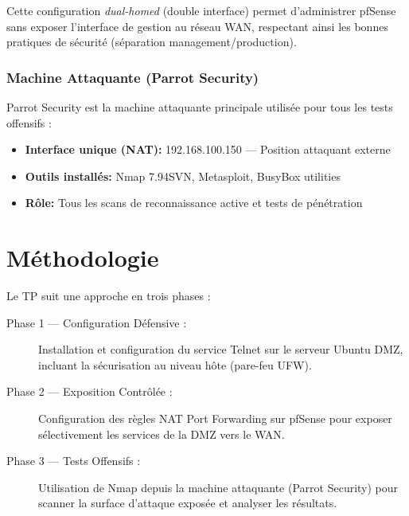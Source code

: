 \documentclass[12pt,a4paper,openany]{report}
\begin{document}
	Cette configuration \textit{dual-homed} (double interface) permet d'administrer 
	pfSense sans exposer l'interface de gestion au réseau WAN, respectant ainsi les 
	bonnes pratiques de sécurité (séparation management/production).
	
	\subsubsection{Machine Attaquante (Parrot Security)}
	Parrot Security est la machine attaquante principale utilisée pour tous les 
	tests offensifs :
	\begin{itemize}
		\item \textbf{Interface unique (NAT):} 192.168.100.150 --- Position attaquant externe
		\item \textbf{Outils installés:} Nmap 7.94SVN, Metasploit, BusyBox utilities
		\item \textbf{Rôle:} Tous les scans de reconnaissance active et tests de pénétration
	\end{itemize}
	
	
	
	\section{Méthodologie}
	Le TP suit une approche en trois phases :
	
	\begin{description}
		\item[Phase 1 --- Configuration Défensive :] Installation et configuration du service Telnet sur le serveur Ubuntu DMZ, incluant la sécurisation au niveau hôte (pare-feu UFW).
		
		\item[Phase 2 --- Exposition Contrôlée :] Configuration des règles NAT Port Forwarding sur pfSense pour exposer sélectivement les services de la DMZ vers le WAN.
		
		\item[Phase 3 --- Tests Offensifs :] Utilisation de Nmap depuis la machine attaquante (Parrot Security) pour scanner la surface d'attaque exposée et analyser les résultats.
	\end{description}
	
\end{document}
